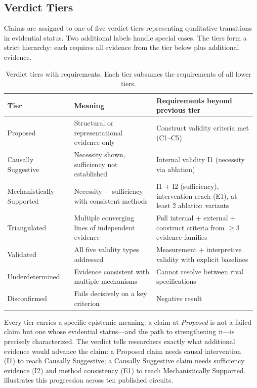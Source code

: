 \documentclass[10pt]{article}
\newcommand{\tighttable}{\setlength{\tabcolsep}{4pt}\renewcommand{\arraystretch}{1.05}}
\begin{document}
\subsection{Verdict Tiers}
\label{sec:verdict-tiers}

Claims are assigned to one of five verdict tiers representing qualitative transitions in evidential status. Two additional labels handle special cases. The tiers form a strict hierarchy: each requires all evidence from the tier below plus additional evidence.

\begin{table}[t]
\centering
\tighttable
\caption{Verdict tiers with requirements. Each tier subsumes the requirements of all lower tiers.}
\label{tab:verdicts}
\small
\begin{tabular}{@{}lp{4.5cm}p{5.5cm}@{}}
\toprule
\textbf{Tier} & \textbf{Meaning} & \textbf{Requirements beyond previous tier} \\
\midrule
Proposed & Structural or representational evidence only & Construct validity criteria met (C1--C5) \\
Causally Suggestive & Necessity shown, sufficiency not established & Internal validity I1 (necessity via ablation) \\
Mechanistically Supported & Necessity + sufficiency with consistent methods & I1 + I2 (sufficiency), intervention reach (E1), at least 2 ablation variants \\
Triangulated & Multiple converging lines of independent evidence & Full internal + external + construct criteria from $\geq 3$ evidence families \\
Validated & All five validity types addressed & Measurement + interpretive validity with explicit baselines \\
\midrule
Underdetermined & Evidence consistent with multiple mechanisms & Cannot resolve between rival specifications \\
Disconfirmed & Fails decisively on a key criterion & Negative result \\
\bottomrule
\end{tabular}
\end{table}

Every tier carries a specific epistemic meaning: a claim at \emph{Proposed} is not a failed claim but one whose evidential status---and the path to strengthening it---is precisely characterized. The verdict tells researchers exactly what additional evidence would advance the claim: a Proposed claim needs causal intervention (I1) to reach Causally Suggestive; a Causally Suggestive claim needs sufficiency evidence (I2) and method consistency (E1) to reach Mechanistically Supported.  illustrates this progression across ten published circuits.
\end{document}

